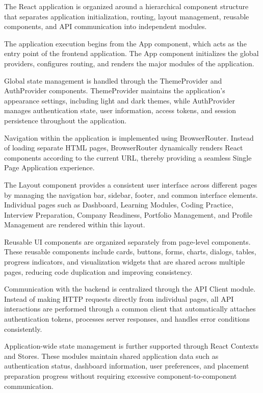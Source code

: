 The React application is organized around a hierarchical component structure that separates application initialization, routing, layout management, reusable components, and API communication into independent modules.

The application execution begins from the App component, which acts as the entry point of the frontend application. The App component initializes the global providers, configures routing, and renders the major modules of the application.

Global state management is handled through the ThemeProvider and AuthProvider components. ThemeProvider maintains the application's appearance settings, including light and dark themes, while AuthProvider manages authentication state, user information, access tokens, and session persistence throughout the application.

Navigation within the application is implemented using BrowserRouter. Instead of loading separate HTML pages, BrowserRouter dynamically renders React components according to the current URL, thereby providing a seamless Single Page Application experience.

The Layout component provides a consistent user interface across different pages by managing the navigation bar, sidebar, footer, and common interface elements. Individual pages such as Dashboard, Learning Modules, Coding Practice, Interview Preparation, Company Readiness, Portfolio Management, and Profile Management are rendered within this layout.

Reusable UI components are organized separately from page-level components. These reusable components include cards, buttons, forms, charts, dialogs, tables, progress indicators, and visualization widgets that are shared across multiple pages, reducing code duplication and improving consistency.

Communication with the backend is centralized through the API Client module. Instead of making HTTP requests directly from individual pages, all API interactions are performed through a common client that automatically attaches authentication tokens, processes server responses, and handles error conditions consistently.

Application-wide state management is further supported through React Contexts and Stores. These modules maintain shared application data such as authentication status, dashboard information, user preferences, and placement preparation progress without requiring excessive component-to-component communication.

